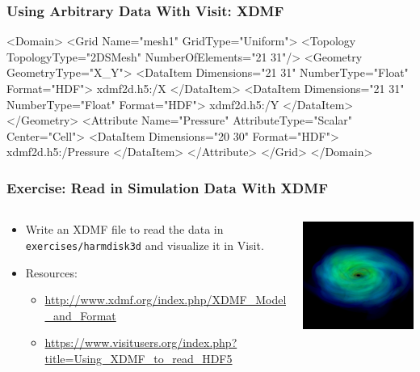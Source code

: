 \documentclass[]{beamer}
\begin{document}
\begin{frame}[fragile]
  \frametitle{Using Arbitrary Data With Visit: XDMF}
\begin{xml}
<Domain>
   <Grid Name="mesh1" GridType="Uniform">
     <Topology TopologyType="2DSMesh"
      NumberOfElements="21 31"/>
     <Geometry GeometryType="X_Y">
       <DataItem Dimensions="21 31" NumberType="Float"
        Format="HDF">
        xdmf2d.h5:/X
       </DataItem>
       <DataItem Dimensions="21 31" NumberType="Float"
        Format="HDF">
        xdmf2d.h5:/Y
       </DataItem>
     </Geometry>
     <Attribute Name="Pressure"
       AttributeType="Scalar" Center="Cell">
       <DataItem Dimensions="20 30" Format="HDF">
        xdmf2d.h5:/Pressure
       </DataItem>
     </Attribute>
   </Grid>
 </Domain>
\end{xml}
\end{frame}

\begin{frame}
  \frametitle{Exercise: Read in Simulation Data With XDMF}
  \begin{columns}
    \begin{column}{6cm}
      \begin{itemize}
      \item Write an XDMF file to read the data in {\tt
          exercises/harmdisk3d} and visualize it in Visit.
      \item Resources:
        \begin{itemize}
        \item \url{http://www.xdmf.org/index.php/XDMF_Model_and_Format}
        \item \url{https://www.visitusers.org/index.php?title=Using_XDMF_to_read_HDF5}
        \end{itemize}
      \end{itemize}
    \end{column}
    \begin{column}{6cm}
      \begin{center}
        \includegraphics[width=6cm]{figures/disk_image_no_text}
      \end{center}
    \end{column}
  \end{columns}
\end{frame}
\end{document}
